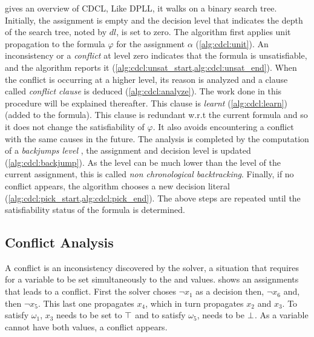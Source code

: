  gives an overview of CDCL, Like DPLL,  it walks on a binary search tree.
Initially, the  assignment is empty and the decision level that 
indicates the depth of the search tree, noted by $dl$, is set to zero.
The algorithm first applies unit propagation to the formula $\varphi$ for the  assignment $\alpha$ (\cref{alg:cdcl:unit}).
An inconsistency or a \emph{conflict} at level zero indicates that the formula is unsatisfiable, and the algorithm
reports it (\cref{alg:cdcl:unsat_start,alg:cdcl:unsat_end}). When the conflict is occurring at a higher level, its
reason is analyzed and a clause called \emph{conflict clause} is deduced (\cref{alg:cdcl:analyze}).
The work done in this procedure will be explained thereafter.
This clause is \emph{learnt} (\cref{alg:cdcl:learn}) (added to the formula). This clause is redundant w.r.t the current
formula and so it does not change the satisfiability of $\varphi$. It also avoids encountering a conflict with the same
causes in the future.
The analysis is completed by the computation of a \emph{backjumps level} , the assignment and decision level is updated (\cref{alg:cdcl:backjump}). As the level can be much lower than the level of the current assignment, this is called \emph{non chronological backtracking}.
Finally, if no conflict appears, the algorithm chooses a new decision literal 
(\cref{alg:cdcl:pick_start,alg:cdcl:pick_end}).
The above steps are repeated until the satisfiability status of the
formula is determined.



\subsection{Conflict Analysis}
A conflict is an inconsistency discovered by the solver, a situation that requires for a variable to be set 
simultaneously to the \true and \false values.  shows an assignments that leads to a conflict.
First the solver choses $\neg x_1$ as a decision then, $\neg x_6$ and, then $\neg x_5$. This last one propagates $x_4$,
which in turn propagates $x_2$ and $x_3$.
To satisfy $\omega_1$, $x_3$ needs to be set to $\top$ and  to satisfy $\omega_5$, 
needs to be $\bot$. As a variable cannot have both values, a conflict appears.

